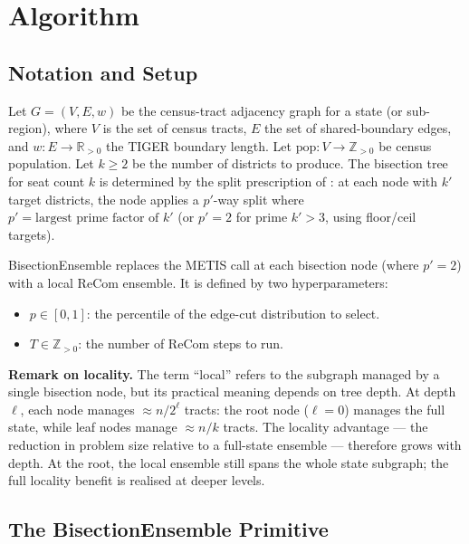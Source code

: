 \section{Algorithm}
\label{sec:algorithm}

\subsection{Notation and Setup}
\label{sec:alg:notation}

Let $G = (V, E, w)$ be the census-tract adjacency graph for a state (or
sub-region), where $V$ is the set of census tracts, $E$ the set of
shared-boundary edges, and $w: E \to \mathbb{R}_{>0}$ the TIGER boundary length.
Let $\text{pop}: V \to \mathbb{Z}_{>0}$ be census population.
Let $k \geq 2$ be the number of districts to produce.
The bisection tree for seat count $k$ is determined by the split prescription
of \citet{dellaLibera2026apportion}: at each node with $k'$ target districts,
the node applies a $p'$-way split where $p' = \text{largest prime factor of } k'$
(or $p' = 2$ for prime $k' > 3$, using floor/ceil targets).

BisectionEnsemble replaces the METIS call at each bisection node (where $p' = 2$)
with a local ReCom ensemble. It is defined by two hyperparameters:
\begin{itemize}
  \item $p \in [0, 1]$: the percentile of the edge-cut distribution to select.
  \item $T \in \mathbb{Z}_{>0}$: the number of ReCom steps to run.
\end{itemize}

\noindent\textbf{Remark on locality.}
The term ``local'' refers to the subgraph managed by a single bisection node,
but its practical meaning depends on tree depth. At depth $\ell$, each node
manages $\approx n/2^\ell$ tracts: the root node ($\ell=0$) manages the full
state, while leaf nodes manage $\approx n/k$ tracts. The locality advantage
--- the reduction in problem size relative to a full-state ensemble --- therefore
grows with depth. At the root, the local ensemble still spans the whole state
subgraph; the full locality benefit is realised at deeper levels.

\subsection{The BisectionEnsemble Primitive}
\label{sec:alg:primitive}

